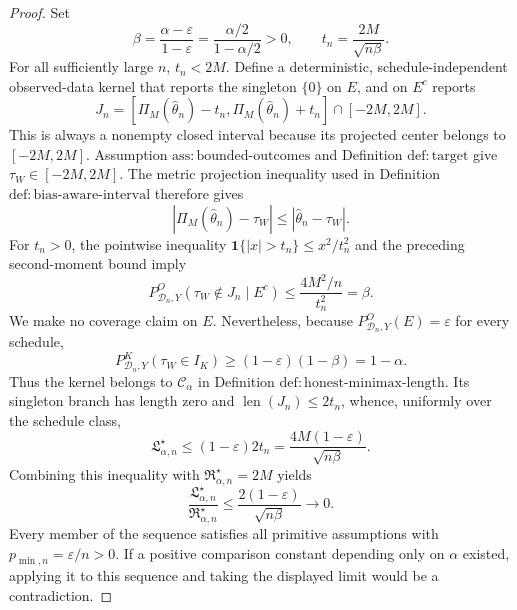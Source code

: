 \documentclass{article}
\begin{document}
\begin{proof}
Set
\[
 \beta=\frac{\alpha-\varepsilon}{1-\varepsilon}
       =\frac{\alpha/2}{1-\alpha/2}>0,
 \qquad
 t_n=\frac{2M}{\sqrt{n\beta}}.
\]
For all sufficiently large \(n\), \(t_n<2M\).  Define a deterministic, schedule-independent observed-data kernel that reports the singleton \(\{0\}\) on \(E\), and on \(E^c\) reports
\[
 J_n=
 [\Pi_M(\widehat\theta_n)-t_n,
   \Pi_M(\widehat\theta_n)+t_n]
 \cap[-2M,2M].
\]
This is always a nonempty closed interval because its projected center belongs to \([-2M,2M]\).  Assumption \(\mathrm{ass:bounded\text{-}outcomes}\) and Definition \(\mathrm{def:target}\) give \(\tau_W\in[-2M,2M]\).  The metric projection inequality used in Definition \(\mathrm{def:bias\text{-}aware\text{-}interval}\) therefore gives
\[
 |\Pi_M(\widehat\theta_n)-\tau_W|
 \le|\widehat\theta_n-\tau_W|.
\]
For \(t_n>0\), the pointwise inequality \(\mathbf 1\{|x|>t_n\}\le x^2/t_n^2\) and the preceding second-moment bound imply
\[
 P^O_{\mathcal D_n,Y}(\tau_W\notin J_n\mid E^c)
 \le\frac{4M^2/n}{t_n^2}=\beta.
\]
We make no coverage claim on \(E\).  Nevertheless, because \(P^O_{\mathcal D_n,Y}(E)=\varepsilon\) for every schedule,
\[
 P^K_{\mathcal D_n,Y}(\tau_W\in I_K)
 \ge(1-\varepsilon)(1-\beta)=1-\alpha.
\]
Thus the kernel belongs to \(\mathcal C_\alpha\) in Definition \(\mathrm{def:honest\text{-}minimax\text{-}length}\).  Its singleton branch has length zero and \(\operatorname{len}(J_n)\le2t_n\), whence, uniformly over the schedule class,
\[
 \mathfrak L_{\alpha,n}^\star
 \le(1-\varepsilon)2t_n
 =\frac{4M(1-\varepsilon)}{\sqrt{n\beta}}.
\]
Combining this inequality with \(\mathfrak R_{\alpha,n}^\star=2M\) yields
\[
 \frac{\mathfrak L_{\alpha,n}^\star}
      {\mathfrak R_{\alpha,n}^\star}
 \le\frac{2(1-\varepsilon)}{\sqrt{n\beta}}
 \longrightarrow0.
\]
Every member of the sequence satisfies all primitive assumptions with \(p_{\min,n}=\varepsilon/n>0\).  If a positive comparison constant depending only on \(\alpha\) existed, applying it to this sequence and taking the displayed limit would be a contradiction.
\end{proof}
\end{document}
